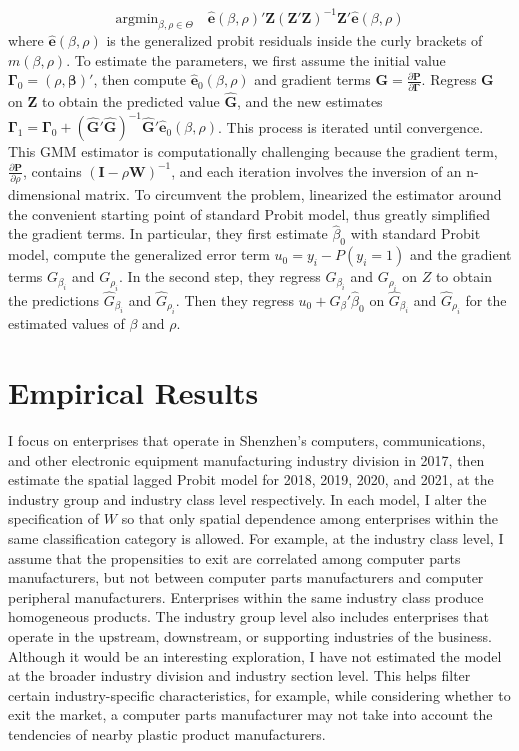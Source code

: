 \begin{equation}
  \nonumber
  \text{argmin}_{\beta,\rho \in \Theta} \quad  \hat{\bm{e}}\left(\beta,\rho\right)' \bm{Z}
  \left(\bm{Z}'\bm{Z}\right)^{-1} \bm{Z}' \hat{\bm{e}}\left(\beta,\rho\right)
\end{equation}
where $\hat{\bm{e}}\left(\beta,\rho\right)$ is the generalized probit residuals inside the curly brackets of $m\left(\beta,\rho\right)$. To estimate the parameters, we first assume the initial value $\bm{\Gamma}_0=\left(\rho,\bm{\beta}\right)'$, then compute $\hat{\bm{e}}_0\left(\beta,\rho\right)$ and gradient terms $\bm{G}=\frac{\partial \bm{P}}{\partial \bm{\Gamma}}$. Regress $\bm{G}$ on $\bm{Z}$ to obtain the predicted value $\hat{\bm{G}}$, and the new estimates $\bm{\Gamma}_1=\bm{\Gamma}_0+\left( \hat{\bm{G}}'\hat{\bm{G}} \right)^{-1} \hat{\bm{G}}' \hat{\bm{e}}_0\left(\beta,\rho\right)$. This process is iterated until convergence. This GMM estimator is computationally challenging because the gradient term,  $\frac{\partial \bm{P}}{\partial \rho}$, contains $\left(\bm{I}-\rho\bm{W}\right)^{-1}$, and each iteration involves the inversion of an n-dimensional matrix. To circumvent the problem, \cite{klier2008clustering} linearized the estimator around the convenient starting point of standard Probit model, thus greatly simplified the gradient terms. In particular, they first estimate $\hat{\beta}_0$ with standard Probit model, compute the generalized error term $u_0=y_i-P\left(y_i=1\right)$ and the gradient terms $G_{\beta_i}$ and $G_{\rho_i}$. In the second step, they regress $G_{\beta_i}$ and $G_{\rho_i}$ on $Z$ to obtain the predictions $\hat{G}_{\beta_i}$ and $\hat{G}_{\rho_i}$. Then they regress $u_0+G_\beta'\hat{\beta}_0$ on $\hat{G}_{\beta_i}$ and $\hat{G}_{\rho_i}$ for the estimated values of $\beta$ and $\rho$.

\section{Empirical Results}

I focus on enterprises that operate in Shenzhen's computers, communications, and other electronic equipment manufacturing industry division in 2017, then estimate the spatial lagged Probit model for 2018, 2019, 2020, and 2021, at the industry group and industry class level respectively. In each model, I alter the specification of $W$ so that only spatial dependence among enterprises within the same classification category is allowed. For example, at the industry class level, I assume that the propensities to exit are correlated among computer parts manufacturers, but not between computer parts manufacturers and computer peripheral manufacturers. Enterprises within the same industry class produce homogeneous products. The industry group level also includes enterprises that operate in the upstream, downstream, or supporting industries of the business. Although it would be an interesting exploration, I have not estimated the model at the broader industry division and industry section level. This helps filter certain industry-specific characteristics, for example, while considering whether to exit the market, a computer parts manufacturer may not take into account the tendencies of nearby plastic product manufacturers.

